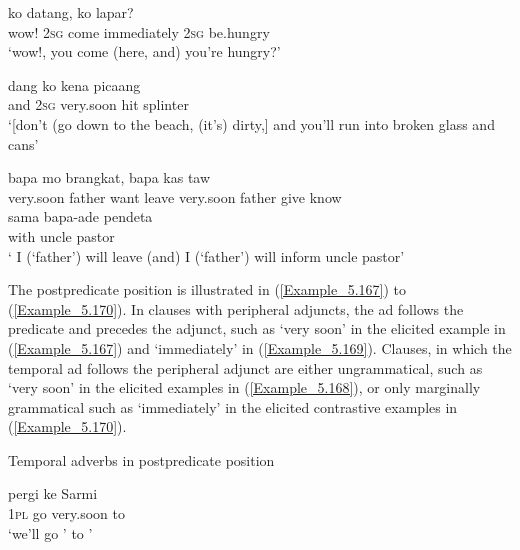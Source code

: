 \ea
\label{Example_5.164}
 {ko} {datang,} {} {ko} {lapar?}\\ %
 wow!  \textsc{2sg}  come  immediately  \textsc{2sg}  be.hungry\\
\glt 
‘wow!, you come (here, and)  you’re hungry?’ \textstyleExampleSource{[081110-002-Cv.0049]}
\z

\ea
\label{Example_5.165}
\gll {{\ldots}} {dang} {ko} {} {kena} {picaang}\\ %
   { } and  \textsc{2sg}  very.soon  hit  splinter\\
\glt 
‘[don’t (go down to the beach, (it’s) dirty,] and  you’ll run into broken glass and cans’ \textstyleExampleSource{[080917-004-CvHt.0002]}
\z

\ea
\label{Example_5.166}
 {{bapa}} {mo} {brangkat,} {} {bapa} {kas} {taw}\\ %
 {very.soon}  {father}  want  leave  very.soon  father  give  know\\
 \gll  sama  {bapa-ade}  {pendeta}\\
 with  {uncle}  {pastor}\\
\glt 
‘ I (‘father’) will leave (and)  I (‘father’) will inform uncle pastor’ \textstyleExampleSource{[080922-001a-CvPh.0339]}
\z


The postpredicate position is illustrated in (\ref{Example_5.167}) to (\ref{Example_5.170}). In clauses with peripheral adjuncts, the ad follows the predicate and precedes the adjunct, such as  ‘very soon’ in the elicited example in (\ref{Example_5.167}) and  ‘immediately’ in (\ref{Example_5.169}). Clauses, in which the temporal ad follows the peripheral adjunct are either ungrammatical, such as  ‘very soon’ in the elicited examples in (\ref{Example_5.168}), or only marginally grammatical such as  ‘immediately’ in the elicited contrastive examples in (\ref{Example_5.170}).


\begin{styleExampleTitle}
Temporal adverbs in postpredicate position
\end{styleExampleTitle}

\ea
\label{Example_5.167}
 {pergi} {} {ke} {Sarmi}\\ %
 \textsc{1pl}  go  very.soon  to  \\
\glt 
‘we’ll go ’ to ’ \textstyleExampleSource{[Elicited MY131113.001]}
\z

